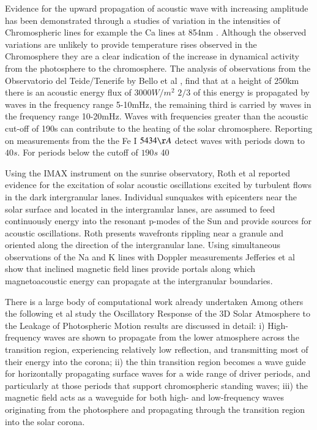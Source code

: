 \documentclass[final,1p]{elsarticle}
\begin{document}
Evidence for the upward propagation of acoustic wave with increasing amplitude has been demonstrated through a studies of variation in the intensities of Chromospheric lines for example the Ca lines at 854nm \cite{Beck2012}. Although the observed variations are unlikely to provide temperature rises observed in the Chromosphere they are a clear indication of the increase in dynamical activity from the photosphere to the chromosphere. The analysis of observations from the Observatorio del Teide/Tenerife by Bello et al \cite{Bello2009}, find that at a height of 250km there is an acoustic energy flux of $3000W/m^2$  $2/3$ of this energy is propagated by waves in the frequency range 5-10mHz, the remaining third is carried by waves in the frequency range 10-20mHz. Waves with frequencies greater than the acoustic cut-off of 190s can contribute to the heating of the solar chromosphere. Reporting on measurements from the the Fe I $5434{\AA}$ \cite{Bello2010A} detect waves with periods down to $40s$. For periods below the cutoff of $190s$ 40%

Using the IMAX instrument on the sunrise observatory, Roth et al  \cite{Roth2010}  reported evidence for the excitation of solar acoustic oscillations excited by turbulent flows  in the dark intergranular lanes.  Individual sunquakes with epicenters near the solar surface and located in the intergranular lanes, are assumed to feed continuously energy into the resonant p-modes of the Sun and provide sources for acoustic oscillations. Roth presents wavefronts rippling near a granule and oriented along the direction of the intergranular lane. Using simultaneous observations of the Na and K lines with Doppler measurements Jefferies et al \cite{Jefferies2006} show that inclined magnetic field lines provide portals along which magnetoacoustic energy can propagate at the intergranular boundaries.

There is a large body of computational work already undertaken Among others the following \cite{Fedun2009} et al study the Oscillatory Response of the 3D Solar Atmosphere to the Leakage of Photospheric Motion results are discussed in detail: i) High-frequency waves are shown to propagate from the lower atmosphere across the transition region, experiencing relatively low reflection, and transmitting most of their energy into the corona; ii) the thin transition region becomes a wave guide for horizontally propagating surface waves for a wide range of driver periods, and particularly at those periods that support chromospheric standing waves; iii) the magnetic field acts as a waveguide for both high- and low-frequency waves originating from the photosphere and propagating through the transition region into the solar corona.
\end{document}
